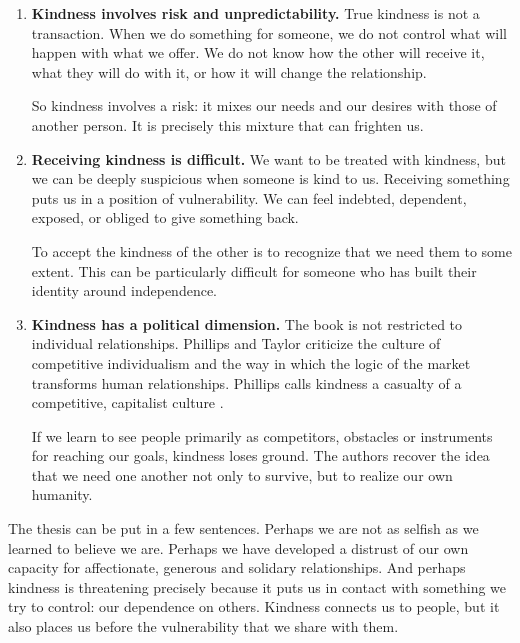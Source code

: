 \begin{enumerate}
The answer that the book builds is that
it does not. Kindness does not require
the disappearance of one's own desire.
On the contrary, it can be deeply
pleasurable for the one who practises
it. Phillips speaks of a ``kindness
instinct'', to say that kindness might
be as elemental as sex
\cite{smallwood-back-talk}.

The mistake is to imagine that, for an
attitude to be truly generous, it must
be free of any personal interest. Nor is
kindness ever pure in the other
direction: whoever one needs and loves
also frustrates, so kindness includes
some aggression and ambivalence
\cite{smallwood-back-talk}.

\item {\bf Kindness involves risk and
unpredictability.} True kindness is not
a transaction. When we do something for
someone, we do not control what will
happen with what we offer. We do not
know how the other will receive it, what
they will do with it, or how it will
change the relationship.

So kindness involves a risk: it mixes
our needs and our desires with those of
another person. It is precisely this
mixture that can frighten us.

\item {\bf Receiving kindness is
difficult.} We want to be treated with
kindness, but we can be deeply
suspicious when someone is kind to us.
Receiving something puts us in a
position of vulnerability. We can feel
indebted, dependent, exposed, or obliged
to give something back.

To accept the kindness of the other is
to recognize that we need them to some
extent. This can be particularly
difficult for someone who has built
their identity around independence.

\item {\bf Kindness has a political
dimension.} The book is not restricted
to individual relationships. Phillips
and Taylor criticize the culture of
competitive individualism and the way in
which the logic of the market transforms
human relationships. Phillips calls
kindness a casualty of a competitive,
capitalist culture
\cite{smallwood-back-talk}.

If we learn to see people primarily as
competitors, obstacles or instruments
for reaching our goals, kindness loses
ground. The authors recover the idea
that we need one another not only to
survive, but to realize our own
humanity.
\end{enumerate}

The thesis can be put in a few
sentences. Perhaps we are not as selfish
as we learned to believe we are. Perhaps
we have developed a distrust of our own
capacity for affectionate, generous and
solidary relationships. And perhaps
kindness is threatening precisely
because it puts us in contact with
something we try to control: our
dependence on others. Kindness connects
us to people, but it also places us
before the vulnerability that we share
with them.

